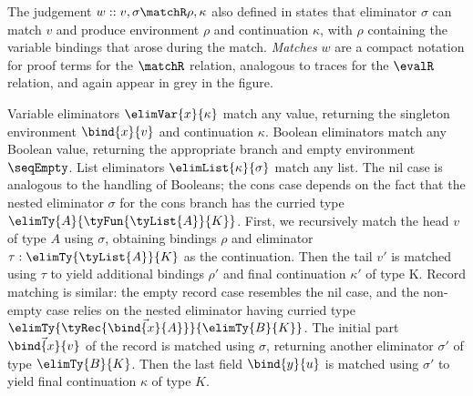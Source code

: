 The judgement $w :: v, \sigma \matchR \rho, \kappa$ also defined in  states that eliminator $\sigma$ can match $v$ and produce environment $\rho$ and continuation $\kappa$, with $\rho$ containing the variable bindings that arose during the match. \emph{Matches} $w$ are a compact notation for proof terms for the $\matchR$ relation, analogous to traces for the $\evalR$ relation, and again appear in grey in the figure.

Variable eliminators $\elimVar{x}{\kappa}$ match any value, returning the singleton environment $\bind{x}{v}$ and continuation $\kappa$. Boolean eliminators match any Boolean value, returning the appropriate branch and empty environment $\seqEmpty$. List eliminators $\elimList{\kappa}{\sigma}$ match any list. The nil case is analogous to the handling of Booleans; the cons case depends on the fact that the nested eliminator $\sigma$ for the cons branch has the curried type $\elimTy{A}{\tyFun{\tyList{A}}{K}}$. First, we recursively match the head $v$ of type $A$ using $\sigma$, obtaining bindings $\rho$ and eliminator $\tau: \elimTy{\tyList{A}}{K}$ as the continuation. Then the tail $v'$ is matched using $\tau$ to yield additional bindings $\rho'$ and final continuation $\kappa'$ of type K. Record matching is similar: the empty record case resembles the nil case, and the non-empty case relies on the nested eliminator having curried type $\elimTy{\tyRec{\vec{\bind{x}{A}}}}{\elimTy{B}{K}}$. The initial part $\vec{\bind{x}{v}}$ of the record is matched using $\sigma$, returning another eliminator $\sigma'$ of type $\elimTy{B}{K}$. Then the last field $\bind{y}{u}$ is matched using $\sigma'$ to yield final continuation $\kappa$ of type $K$.
